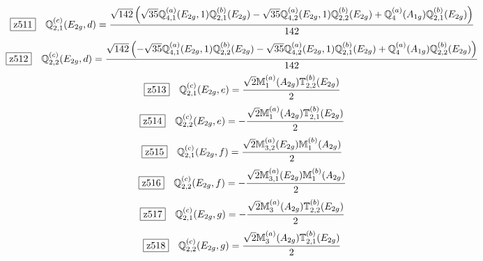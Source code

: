 \documentclass[fleqn,10pt,landscape]{jsarticle}
\begin{document}
\begin{dmath*}
\hspace*{3mm}\fbox{z511}\quad \mathbb{Q}_{2,1}^{(c)}(E_{2g},d)=\frac{\sqrt{142} \left(\sqrt{35} \mathbb{Q}_{4,1}^{(a)}(E_{2g},1) \mathbb{Q}_{2,1}^{(b)}(E_{2g}) - \sqrt{35} \mathbb{Q}_{4,2}^{(a)}(E_{2g},1) \mathbb{Q}_{2,2}^{(b)}(E_{2g}) + \mathbb{Q}_{4}^{(a)}(A_{1g}) \mathbb{Q}_{2,1}^{(b)}(E_{2g})\right)}{142}
\end{dmath*}
\begin{dmath*}
\hspace*{3mm}\fbox{z512}\quad \mathbb{Q}_{2,2}^{(c)}(E_{2g},d)=\frac{\sqrt{142} \left(- \sqrt{35} \mathbb{Q}_{4,1}^{(a)}(E_{2g},1) \mathbb{Q}_{2,2}^{(b)}(E_{2g}) - \sqrt{35} \mathbb{Q}_{4,2}^{(a)}(E_{2g},1) \mathbb{Q}_{2,1}^{(b)}(E_{2g}) + \mathbb{Q}_{4}^{(a)}(A_{1g}) \mathbb{Q}_{2,2}^{(b)}(E_{2g})\right)}{142}
\end{dmath*}
\begin{dmath*}
\hspace*{3mm}\fbox{z513}\quad \mathbb{Q}_{2,1}^{(c)}(E_{2g},e)=\frac{\sqrt{2} \mathbb{M}_{1}^{(a)}(A_{2g}) \mathbb{T}_{2,2}^{(b)}(E_{2g})}{2}
\end{dmath*}
\begin{dmath*}
\hspace*{3mm}\fbox{z514}\quad \mathbb{Q}_{2,2}^{(c)}(E_{2g},e)=- \frac{\sqrt{2} \mathbb{M}_{1}^{(a)}(A_{2g}) \mathbb{T}_{2,1}^{(b)}(E_{2g})}{2}
\end{dmath*}
\begin{dmath*}
\hspace*{3mm}\fbox{z515}\quad \mathbb{Q}_{2,1}^{(c)}(E_{2g},f)=\frac{\sqrt{2} \mathbb{M}_{3,2}^{(a)}(E_{2g}) \mathbb{M}_{1}^{(b)}(A_{2g})}{2}
\end{dmath*}
\begin{dmath*}
\hspace*{3mm}\fbox{z516}\quad \mathbb{Q}_{2,2}^{(c)}(E_{2g},f)=- \frac{\sqrt{2} \mathbb{M}_{3,1}^{(a)}(E_{2g}) \mathbb{M}_{1}^{(b)}(A_{2g})}{2}
\end{dmath*}
\begin{dmath*}
\hspace*{3mm}\fbox{z517}\quad \mathbb{Q}_{2,1}^{(c)}(E_{2g},g)=- \frac{\sqrt{2} \mathbb{M}_{3}^{(a)}(A_{2g}) \mathbb{T}_{2,2}^{(b)}(E_{2g})}{2}
\end{dmath*}
\begin{dmath*}
\hspace*{3mm}\fbox{z518}\quad \mathbb{Q}_{2,2}^{(c)}(E_{2g},g)=\frac{\sqrt{2} \mathbb{M}_{3}^{(a)}(A_{2g}) \mathbb{T}_{2,1}^{(b)}(E_{2g})}{2}
\end{dmath*}
\end{document}
